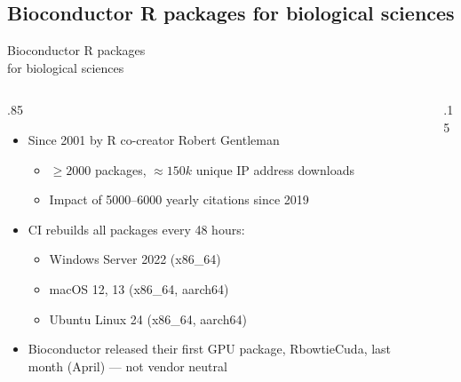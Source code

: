 \documentclass[
aspectratio=169,
xcolor={usenames}
]{beamer}
\begin{document}
\subsection{Bioconductor R packages for biological sciences}
\begin{frame}{\hspace{8cm}Bioconductor R packages\\%
    \hspace{8cm}for biological sciences}
  \begin{columns}[T]
    \begin{column}{.85\framewidth}
      \begin{itemize}[<+->]
      \item Since 2001 by R co-creator Robert Gentleman
        \begin{itemize}[<.->]
        \item $\ge 2000$ packages, %
          $\approx 150k$ unique IP address downloads\footnotemark[1]
        \item Impact of 5000--6000 yearly citations since 2019\footnotemark[1]
        \end{itemize}
      \item CI rebuilds all packages every 48 hours:
        \begin{itemize}[<.->]
        \item Windows Server 2022 (x86\_64)
        \item macOS 12, 13 (x86\_64, aarch64)
        \item Ubuntu Linux 24 (x86\_64, aarch64)
        \end{itemize}
      \item Bioconductor released their first GPU package, RbowtieCuda, %
        last month (April) --- not vendor neutral
      \end{itemize}
    \end{column}
    \begin{column}{.15\framewidth}
\end{column}
\end{columns}
\end{frame}
\end{document}
